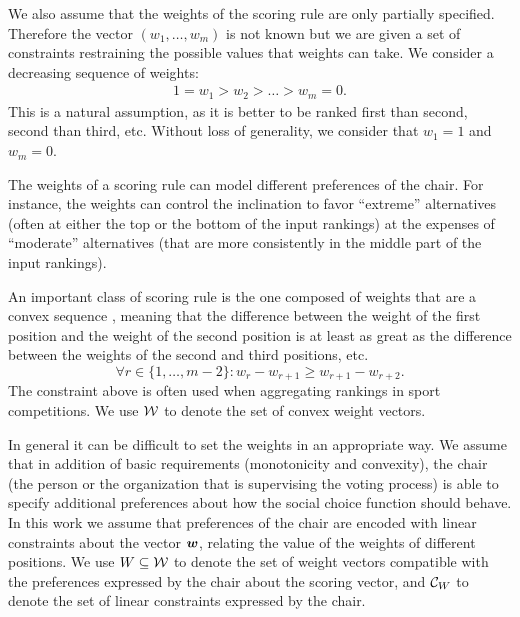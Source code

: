 \medskip
We also assume that the weights of the scoring rule are only partially specified.
Therefore the vector $(w_1,\ldots,w_m)$  is not known but we are given a set of constraints restraining the possible values that weights can take.
We consider a decreasing sequence of weights:
\begin{align}
1=w_{1} > w_{2} > \ldots > w_{m}=0. \label{eq:monotone}
\end{align}
This is a natural assumption, as it is better to be ranked first than second, second than third, etc. 
Without loss of generality, we consider that $w_1=1$ and $w_m=0$. 

The weights of a scoring rule can model different preferences of the chair. 
For instance, the weights can control the inclination to favor ``extreme'' alternatives (often at either the top or the bottom of the input rankings) at the expenses of ``moderate'' alternatives (that are more consistently in the middle part of the input rankings).

An important class of scoring rule is the one composed of weights that are a convex sequence \citep{Stein1994,Llamazares2016}, meaning that the difference between the weight of the first position and the weight of the second position is at least as great as the difference between the weights of the second and third positions, etc.
\begin{equation} 
\label{eq:convexity}
\forall r \in \{1,\ldots,m-2\}: w_r - w_{r+1} \geq w_{r+1}-w_{r+2}.
\end{equation}
The constraint above is often used when aggregating rankings in sport competitions.
We use $\mathcal{W}$ to denote the set of convex weight vectors.

In general it can be difficult to set the weights in an appropriate way.
We assume that in addition of basic requirements (monotonicity and convexity), the chair (the person or the organization that is supervising the voting process) is able to specify additional preferences about how the social choice function should behave.
In this work we assume that preferences of the chair are encoded with linear constraints about the vector $\bm{w}$, relating the value of the weights of different positions.
We use $W \subseteq \mathcal{W}$ to denote the set of weight vectors compatible with the preferences expressed by the chair about the scoring vector, and $\mathcal{C}_W$ to denote the set of linear constraints expressed by the chair.

